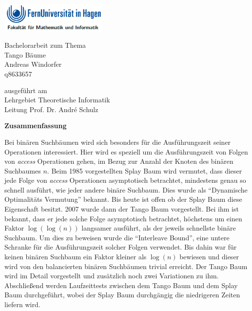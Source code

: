 \documentclass[a4paper,12pt]{article}
\begin{document}
\begin{center}
\includegraphics[width= 0.4\textwidth]{Medien/kleinkram/UniLogo}
\end{center}
\bigskip


 \begin{center}
 	\LARGE{Bachelorarbeit zum Thema\\
 	Tango Bäume}\\
 \bigskip
 \bigskip
 \bigskip
 \bigskip
\bigskip
\bigskip 
\bigskip
\bigskip
 \large{
 Andreas Windorfer\\
 q8633657}
 \end{center}
 \bigskip
 \bigskip
 \bigskip
 \bigskip 
 \bigskip
 \bigskip
 \bigskip 
  \bigskip 
 \bigskip
 \bigskip
 \bigskip 
  \begin{center}
 ausgeführt am\\
 Lehrgebiet Theoretische Informatik\\
 Leitung Prof. Dr. André Schulz\\
\end{center}

\author{Andreas Windorfer}





\newpage
\begin{center}
\textbf{Zusammenfassung}
\end{center}
 Bei binären Suchbäumen wird sich besonders für die Ausführungszeit seiner Operationen  interessiert. Hier wird es speziell um die Ausführungszeit von Folgen von \textit{access} Operationen gehen, im Bezug zur Anzahl der Knoten des binären Suchbaumes $n$. Beim 1985  vorgestellten Splay Baum \cite{splay} wird vermutet, dass dieser jede Folge von  \textit{access} Operationen asymptotisch betrachtet, mindestens genau so schnell ausführt, wie jeder andere binäre Suchbaum. Dies wurde als \enquote{Dynamische Optimalitäts Vermutung} bekannt. Bis heute ist offen ob der Splay Baum diese Eigenschaft besitzt.  2007 wurde dann der Tango Baum  \cite{demainDinamicOpti} vorgestellt. Bei ihm ist bekannt, dass er jede solche Folge asymptotisch betrachtet, höchstens um einen Faktor $\log\left(\log\left(n\right)\right)$ langsamer ausführt, als der jeweils schnellste binäre Suchbaum. Um dies zu beweisen wurde die \enquote{Interleave Bound}, eine untere Schranke für die Ausführungszeit solcher Folgen verwendet.  Bis dahin war für keinen binären Suchbaum ein Faktor kleiner als $\log\left(n\right)$ bewiesen und dieser wird von den balancierten binären Suchbäumen trivial erreicht. Der Tango Baum wird im Detail vorgestellt und zusätzlich noch zwei Variationen zu ihm. Abschließend werden Laufzeittests zwischen dem Tango Baum und dem Splay Baum durchgeführt, wobei der Splay Baum durchgängig die niedrigeren Zeiten liefern wird. 
\newpage
\tableofcontents
\newpage
\end{document}
